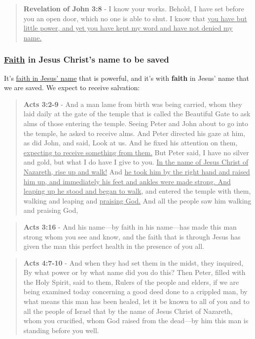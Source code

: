 \documentclass[11pt]{article}
\begin{document}
\begin{quote}
\textbf{Revelation of John 3:8} - I know your works. Behold, I have set before you an open door, which no one is able to shut. I know that \uline{you have but little power, and yet you have kept my word and have not denied my name.}
\end{quote}

\subsubsection{\underline{Faith} in Jesus Christ's name to be saved}
\label{sec:org8b9f941}
It's \uline{faith in Jesus' name} that is powerful, and it's with \textbf{faith} in Jesus' name that we are saved. We expect to receive salvation:

\begin{quote}
\textbf{Acts 3:2-9} - And a man lame from birth was being carried, whom they laid daily at the gate of the temple that is called the Beautiful Gate to ask alms of those entering the temple. Seeing Peter and John about to go into the temple, he asked to receive alms. And Peter directed his gaze at him, as did John, and said, Look at us. And he fixed his attention on them, \uline{expecting to receive something from them.} But Peter said, I have no silver and gold, but what I do have I give to you. \uline{In the name of Jesus Christ of Nazareth, rise up and walk!} And \uline{he took him by the right hand and raised him up, and immediately his feet and ankles were made strong. And leaping up he stood and began to walk}, and entered the temple with them, walking and leaping and \uline{praising God.} And all the people saw him walking and praising God,
\end{quote}

\begin{quote}
\textbf{Acts 3:16} - And his name—by faith in his name—has made this man strong whom you see and know, and the faith that is through Jesus has given the man this perfect health in the presence of you all.
\end{quote}

\begin{quote}
\textbf{Acts 4:7-10} - And when they had set them in the midst, they inquired, By what power or by what name did you do this? Then Peter, filled with the Holy Spirit, said to them, Rulers of the people and elders, if we are being examined today concerning a good deed done to a crippled man, by what means this man has been healed, let it be known to all of you and to all the people of Israel that by the name of Jesus Christ of Nazareth, whom you crucified, whom God raised from the dead—by him this man is standing before you well.
\end{quote}
\end{document}
